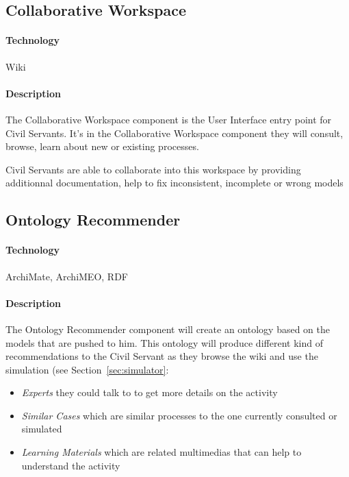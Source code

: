 \documentclass{learnpad}
\begin{document}
\subsection{Collaborative Workspace}
\label{sec:collaborative-workspace}

\paragraph{Technology}
Wiki

\paragraph{Description}
The Collaborative Workspace component is the User Interface entry point for
Civil Servants.  It's in the Collaborative Workspace component they will
consult, browse, learn about new or existing processes.

Civil Servants are able to collaborate into this workspace by providing
additionnal documentation, help to fix inconsistent, incomplete or wrong models

\subsection{Ontology Recommender}
\label{sec:ontology-recommender}

\paragraph{Technology}
ArchiMate, ArchiMEO, RDF

\paragraph{Description}
The Ontology Recommender component will create an ontology based on the models
that are pushed to him.  This ontology will produce different kind of
recommendations to the Civil Servant as they browse the wiki and use the
simulation (see Section~\ref{sec:simulator}:
\begin{itemize}
	\item \emph{Experts} they could talk to to get more details on the activity
	\item \emph{Similar Cases} which are similar processes to the one currently
		consulted or simulated
	\item \emph{Learning Materials} which are related
		multimedias that can help to understand the activity
\end{itemize}
\end{document}
